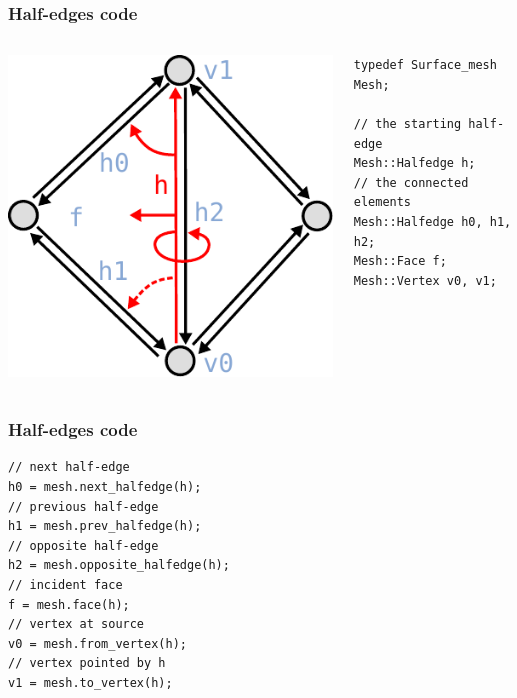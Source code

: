 \begin{frame}[fragile]
\frametitle{Half-edges code}
\begin{columns}[c]
  \begin{column}{0.4\textwidth}
\includegraphics[width=\textwidth]{figures/halfedge-queries}
  \end{column}
  \begin{column}{0.6\textwidth}
  \lstset{ 
  	numbers=none, 
  	xleftmargin=0cm, 
  	xrightmargin=0cm
  }
\begin{lstlisting}
typedef Surface_mesh Mesh;

// the starting half-edge
Mesh::Halfedge h;
// the connected elements
Mesh::Halfedge h0, h1, h2;
Mesh::Face f;
Mesh::Vertex v0, v1;
\end{lstlisting}
  \end{column}
\end{columns}
\end{frame}

\begin{frame}[fragile]
\frametitle{Half-edges code}
\lstset{ numbers=none }
\begin{lstlisting}
// next half-edge
h0 = mesh.next_halfedge(h);
// previous half-edge
h1 = mesh.prev_halfedge(h);
// opposite half-edge
h2 = mesh.opposite_halfedge(h);
// incident face
f = mesh.face(h);
// vertex at source
v0 = mesh.from_vertex(h);
// vertex pointed by h
v1 = mesh.to_vertex(h);
\end{lstlisting}
\end{frame}


